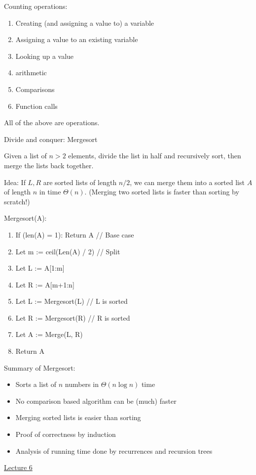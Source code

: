\documentclass[12pt]{article}
\begin{document}
Counting operations: \begin{enumerate}
    \item Creating (and assigning a value to) a variable
    \item Assigning a value to an existing variable
    \item Looking up a value
    \item arithmetic
    \item Comparisons
    \item Function calls
\end{enumerate} All of the above are operations.

Divide and conquer: Mergesort

Given a list of $n > 2$ elements, divide the list in half and recursively sort, then merge the lists back together.

Idea: If $L, R$ are sorted lists of length $n / 2$, we can merge them into a sorted list $A$ of length $n$ in time $\Theta(n)$. (Merging two sorted lists is faster than sorting by scratch!)

Mergesort(A): \begin{enumerate}
    \item If (len(A) = 1): Return A      // Base case
    \item Let m := ceil(Len(A) / 2)      // Split
    \item Let L := A[1:m]
    \item Let R := A[m+1:n]
    \item Let L := Mergesort(L)          // L is sorted
    \item Let R := Mergesort(R)          // R is sorted
    \item Let A := Merge(L, R)
    \item Return A
\end{enumerate}

Summary of Mergesort: \begin{itemize}
    \item Sorts a list of $n$ numbers in $\Theta(n\log n)$ time
    \item No comparison based algorithm can be (much) faster
    \item Merging sorted lists is easier than sorting
    \item Proof of correctness by induction
    \item Analysis of running time done by recurrences and recursion trees
\end{itemize}


\underline{Lecture 6}
\end{document}
